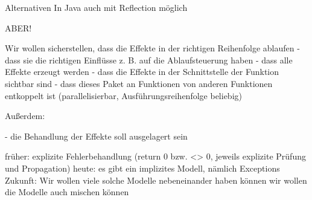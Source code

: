 \begin{frame}[fragile]{Alternativen}
In Java auch mit Reflection möglich
\end{frame}


ABER!

Wir wollen sicherstellen, dass die Effekte in der richtigen Reihenfolge ablaufen
- dass sie die richtigen Einflüsse z. B. auf die Ablaufsteuerung haben
- dass alle Effekte erzeugt werden
- dass die Effekte in der Schnittstelle der Funktion sichtbar sind
- dass  dieses Paket an Funktionen von anderen Funktionen entkoppelt ist (parallelisierbar, Ausführungsreihenfolge beliebig)


Außerdem:

- die Behandlung der Effekte soll ausgelagert sein



früher: explizite Fehlerbehandlung (return 0 bzw. <> 0, jeweils explizite Prüfung und Propagation)
heute: es gibt ein implizites Modell, nämlich Exceptions
Zukunft: Wir wollen viele solche Modelle nebeneinander haben können
wir wollen die Modelle auch mischen können


%



%

